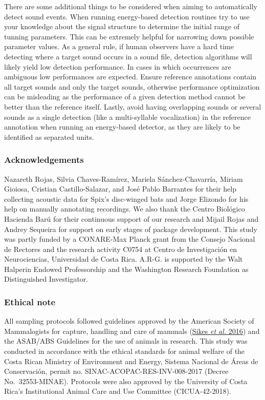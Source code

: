 \documentclass[
]{article}
\begin{document}
There are some additional things to be considered when aiming to
automatically detect sound events. When running energy-based detection
routines try to use your knowledge about the signal structure to
determine the initial range of tunning parameters. This can be extremely
helpful for narrowing down possible parameter values. As a general rule,
if human observers have a hard time detecting where a target sound
occurs in a sound file, detection algorithms will likely yield low
detection performance. In cases in which occurrences are ambiguous low
performances are expected. Ensure reference annotations contain all
target sounds and only the target sounds, otherwise performance
optimization can be misleading as the performance of a given detection
method cannot be better than the reference itself. Lastly, avoid having
overlapping sounds or several sounds as a single detection (like a
multi-syllable vocalization) in the reference annotation when running an
energy-based detector, as they are likely to be identified as separated
units.

\hypertarget{acknowledgements}{%
\subsubsection{Acknowledgements}\label{acknowledgements}}

Nazareth Rojas, Silvia Chaves-Ramírez, Mariela Sánchez-Chavarría, Miriam
Gioiosa, Cristian Castillo-Salazar, and José Pablo Barrantes for their
help collecting acoustic data for Spix's disc-winged bats and Jorge
Elizondo for his help on manually annotating recordings. We also thank
the Centro Biológico Hacienda Barú for their continuous support of our
research and Mijail Rojas and Andrey Sequeira for support on early
stages of package development. This study was partly funded by a
CONARE-Max Planck grant from the Consejo Nacional de Rectores and the
research activity C0754 at Centro de Investigación en Neurociencias,
Universidad de Costa Rica. A.R-G. is supported by the Walt Halperin
Endowed Professorship and the Washington Research Foundation as
Distinguished Investigator.

\hypertarget{ethical-note}{%
\subsubsection{Ethical note}\label{ethical-note}}

All sampling protocols followed guidelines approved by the American
Society of Mammalogists for capture, handling and care of mammals
(\protect\hyperlink{ref-Sikes2016}{Sikes \emph{et al.} 2016}) and the
ASAB/ABS Guidelines for the use of animals in research. This study was
conducted in accordance with the ethical standards for animal welfare of
the Costa Rican Ministry of Environment and Energy, Sistema Nacional de
Áreas de Conservación, permit no. SINAC-ACOPAC-RES-INV-008-2017 (Decree
No.~32553-MINAE). Protocols were also approved by the University of
Costa Rica's Institutional Animal Care and Use Committee
(CICUA-42-2018).
\end{document}
